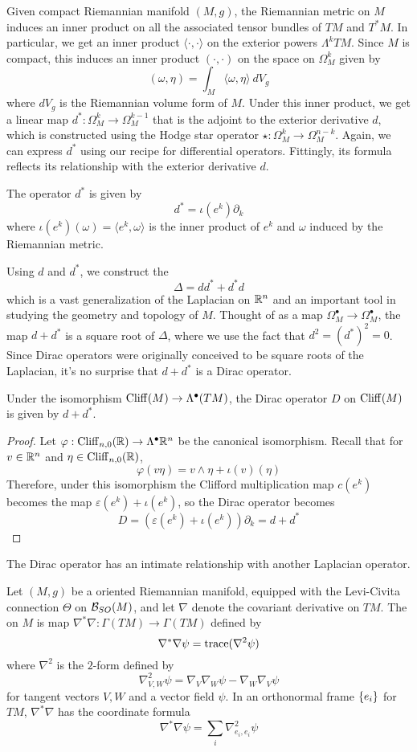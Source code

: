 Given compact Riemannian manifold $(M,g)$, the Riemannian metric on $M$ induces an
inner product on all the associated tensor bundles of $TM$ and $T^*M$. In
particular, we get an inner product $\langle \cdot,\cdot \rangle $ on the exterior
powers $\Lambda^kTM$. Since $M$ is compact, this induces an inner product
$(\cdot, \cdot)$ on the space on $\Omega_M^k$ given by
\[
(\omega,\eta) = \int_M \langle \omega, \eta \rangle~dV_g
\]
where $dV_g$ is the Riemannian volume form of $M$. Under this inner product,
we get a linear map $d^* : \Omega^k_M \to \Omega^{k-1}_M$ that is the adjoint to the
exterior derivative $d$, which is constructed using the Hodge star operator
$\star : \Omega^k_M \to \Omega_M^{n-k}$. Again, we can express $d^*$ using our
recipe for differential operators. Fittingly, its formula reflects its relationship
with the exterior derivative $d$.
%
\begin{prop}
The operator $d^*$ is given by
\[
d^* = \iota(e^k)\partial_k
\]
where $\iota(e^k)(\omega) = \langle e^k, \omega \rangle$ is the inner product of
$e^k$ and $\omega$ induced by the Riemannian metric.
\end{prop}
%
Using $d$ and $d^*$, we construct the 
\[
\Delta = dd^* + d^*d
\]
which is a vast generalization of the Laplacian on $\mathbb{R}^n$ and an important tool in
studying the geometry and topology of $M$. Thought of as a
map $\Omega^\bullet_M \to \Omega_M^\bullet$, the map $d + d^*$ is a square root
of $\Delta$, where we use the fact that $d^2 = (d^*)^2 = 0$. Since Dirac operators
were originally conceived to be square roots of the Laplacian, it's no surprise
that $d + d^*$ is a Dirac operator.
%
\begin{thm}
Under the isomorphism $\operatorname{Cliff}(M) \to \Lambda^\bullet(TM)$, the Dirac operator $D$
on $\operatorname{Cliff}(M)$ is given by $d + d^*$.
\end{thm}
%
\begin{proof}
Let $\varphi : \operatorname{Cliff}_{n,0}(\mathbb{R}) \to \Lambda^\bullet \mathbb{R}^n$ be the canonical isomorphism.
Recall that for $v \in \mathbb{R}^n$ and $\eta \in \operatorname{Cliff}_{n,0}(\mathbb{R})$,
\[
\varphi(v\eta) = v \wedge \eta + \iota(v)(\eta)
\]
Therefore, under this isomorphism the Clifford multiplication map $c(e^k)$ becomes
the map $\varepsilon(e^k) + \iota(e^k)$, so the Dirac operator becomes
\[
D = (\varepsilon(e^k) + \iota(e^k))\partial_k = d + d^*
\]
\end{proof}
%
The Dirac operator has an intimate relationship with another Laplacian operator.
\begin{defn}
Let $(M,g)$ be a oriented Riemannian manifold, equipped with the Levi-Civita connection
$\Theta$ on $\mathcal{B}_{SO}(M)$, and let $\nabla$ denote the covariant derivative on $TM$.
The  on $M$ is map $\nabla^*\nabla : \Gamma(TM) \to \Gamma(TM)$
defined by
\[
\nabla^*\nabla\psi = \operatorname{trace}(\nabla^2\psi)
\]
where $\nabla^2$ is the $2$-form defined by
\[
\nabla^2_{V,W}\psi = \nabla_V\nabla_W\psi - \nabla_W\nabla_V\psi
\]
for tangent vectors $V,W$ and a vector field $\psi$. In an orthonormal frame $\left\lbrace e_i \right\rbrace$
for $TM$, $\nabla^*\nabla$ has the coordinate formula
\[
\nabla^*\nabla\psi = \sum_i \nabla^2_{e_i, e_i}\psi
\]
\end{defn}
